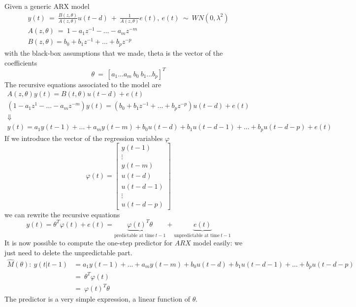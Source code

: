 Given a generic ARX model
\begin{gather*}
y( t) \ =\ \frac{B( z,\theta )}{A( z,\theta )} u( t-d) \ +\ \frac{1}{A( z,\theta )} e( t) ,\ e( t) \ \sim \ WN\left( 0,\lambda ^{2}\right)\\
A( z,\theta ) \ =\ 1-a_{1} z^{-1} -\dotsc -a_{m} z^{-m}\\
B( z,\theta ) =b_{0} +b_{1} z^{-1} +\dotsc +b_{p} z^{-p}
\end{gather*}
with the black-box assumptions that we made, theta is the vector of the coefficients
\begin{equation*}
\theta \ =\ [ a_{1} \dotsc a_{m} \ b_{0} \ b_{1} \dotsc b_{p}]^{T}
\end{equation*}
The recursive equations associated to the model are
\begin{gather*}
A( z,\theta ) y( t) =B( t,\theta ) u( t-d) +e( t)\\
\left( 1-a_{1} z^{1} -\dotsc -a_{m} z^{-m}\right) y( t) =\left( b_{0} +b_{1} z^{-1} +\dotsc +b_{p} z^{-p}\right) u( t-d) +e( t)\\
\Downarrow \\
y( t) =a_{1} y( t-1) +\dotsc +a_{m} y( t-m) +b_{0} u( t-d) +b_{1} u( t-d-1) +\dotsc +b_{p} u( t-d-p) +e( t)
\end{gather*}
If we introduce the vector of the regression variables $ \varphi $
\begin{equation*}
\varphi ( t) =\begin{bmatrix}
y( t-1)\\
\vdots \\
y( t-m)\\
u( t-d)\\
u( t-d-1)\\
\vdots \\
u( t-d-p)
\end{bmatrix}
\end{equation*}
we can rewrite the recursive equations
\begin{equation*}
y( t) =\theta ^{T} \varphi ( t) +e( t) =\underbrace{\varphi ( t)^{T} \theta }_{\text{predictable at time} \ t-1} +\underbrace{e( t)}_{\text{unpredictable at time} \ t-1}
\end{equation*}
It is now possible to compute the one-step predictor for $ ARX$ model easily: we just need to delete the unpredictable part.
\begin{align*}
\hat{M}( \theta ) :\ \hat{y}( t|t-1) & =a_{1} y( t-1) +\dotsc +a_{m} y( t-m) +b_{0} u( t-d) +b_{1} u( t-d-1) +\dotsc +b_{p} u( t-d-p)\\
 & =\ \theta ^{T} \varphi ( t) \ \\
 & =\ \varphi ( t)^{T} \theta 
\end{align*}
The predictor is a very simple expression, a linear function of $ \theta $.

